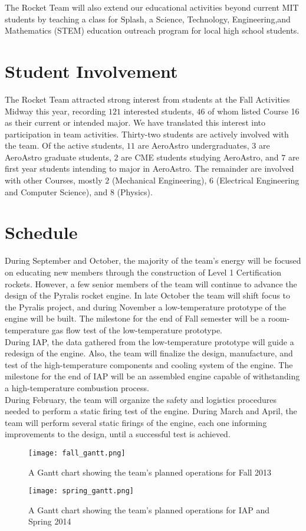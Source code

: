 \documentclass{article}
\begin{document}
The Rocket Team will also extend our educational activities beyond current MIT students by teaching a class for Splash, a Science, Technology, Engineering,and Mathematics (STEM) education outreach program for local high school students.

\section*{Student Involvement}
The Rocket Team attracted strong interest from students at the Fall Activities Midway this year, recording $121$ interested students, $46$ of whom listed Course 16 as their current or intended major. We have translated this interest into participation in team activities. Thirty-two students are actively involved with the team. Of the active students, $11$ are AeroAstro undergraduates, $3$ are AeroAstro graduate students, $2$ are CME students studying AeroAstro, and $7$ are first year students intending to major in AeroAstro. The remainder are involved with other Courses, mostly $2$ (Mechanical Engineering), $6$ (Electrical Engineering and Computer Science), and $8$ (Physics).\\

\section*{Schedule}
During September and October, the majority of the team's energy will be focused on educating new members through the construction of Level 1 Certification rockets. However, a few senior members of the team will continue to advance the design of the Pyralis rocket engine. In late October the team will shift focus to the Pyralis project, and during November a low-temperature prototype of the engine will be built. The milestone for the end of Fall semester will be a room-temperature gas flow test of the low-temperature prototype.\\

During IAP, the data gathered from the low-temperature prototype will guide a redesign of the engine. Also, the team will finalize the design, manufacture, and test of the high-temperature components and cooling system of the engine. The milestone for the end of IAP will be an assembled engine capable of withstanding a high-temperature combustion process. \\

During February, the team will organize the safety and logistics procedures needed to perform a static firing test of the engine. During March and April, the team will perform several static firings of the engine, each one informing improvements to the design, until a successful test is achieved.
\begin{figure}[H]
\centering
\texttt{[image: fall\_gantt.png]}
\caption{A Gantt chart showing the team's planned operations for Fall 2013} 
\label{fall_gantt}
\end{figure}
\begin{figure}[H]
\centering
\texttt{[image: spring\_gantt.png]}
\caption{A Gantt chart showing the team's planned operations for IAP and Spring 2014} 
\label{spring_gantt}
\end{figure}
\end{document}
